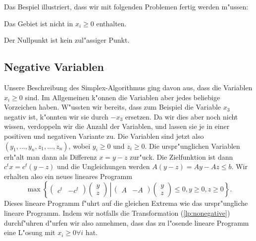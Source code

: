Das Bespiel illustriert, dass wir mit folgenden Problemen fertig werden
m"ussen:
\begin{compactenum}
\item Das Gebiet ist nicht in $x_i\ge 0$ enthalten.
\item Der Nullpunkt ist kein zul"assiger Punkt.
\end{compactenum}

\subsection{Negative Variablen}
Unsere Beschreibung des Simplex-Algorithmus ging davon aus, dass die
Variablen $x_i\ge 0$ sind.
Im Allgemeinen k"onnen die Variablen aber jedes beliebige Vorzeichen
haben.
W"ussten wir bereits, dass zum Beispiel die Variable $x_3$ negativ ist,
k"onnten wir sie durch $-x_3$ ersetzen.
Da wir dies aber noch nicht wissen, verdoppeln wir die Anzahl der
Variablen, und lassen sie je in einer positiven und negativen
Variante zu. Die Variablen sind jetzt also
$(y_1,\dots,y_n,z_1,\dots,z_n)$, wobei $y_i\ge 0$ und $z_i\ge 0$.
Die urspr"unglichen Variablen erh"alt man dann als Differenz
$x=y-z$ zur"uck.
Die Zielfunktion ist dann $c^tx=c^t(y-z)$ und die Ungleichungen
werden $A(y-z)=Ay-Az\le b$. Wir erhalten also ein neues lineares Programm
\begin{equation}
\max
\left\{
\begin{pmatrix}c^t&-c^t\end{pmatrix}
\begin{pmatrix}y\\z\end{pmatrix}\,\left|\,
\begin{pmatrix}A&-A\end{pmatrix}\begin{pmatrix}y\\z\end{pmatrix}\le 0, y\ge 0, z\ge 0
\right.
\right\}.
\label{lp:nonegative}
\end{equation}
Dieses lineare Programm f"uhrt auf die gleichen Extrema wie das urspr"ungliche
lineare Programm. Indem wir notfalls die Transformation 
(\ref{lp:nonegative}) durchf"uhren d"urfen wir also annehmen, dass
das zu l"osende lineare Programm eine L"osung mit $x_i\ge 0\forall i$ hat.


